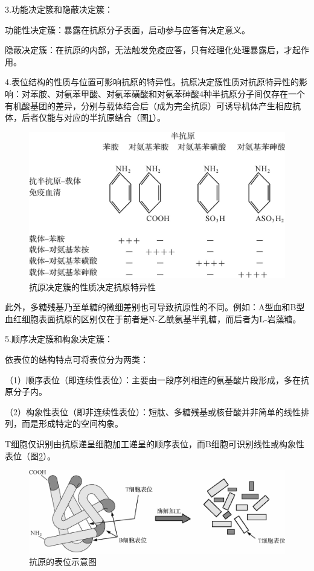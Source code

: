 3.功能决定簇和隐蔽决定簇：

功能性决定簇：暴露在抗原分子表面，启动参与应答有决定意义。

隐蔽决定簇：在抗原的内部，无法触发免疫应答，只有经理化处理暴露后，才起作用。

4.表位结构的性质与位置可影响抗原的特异性。抗原决定簇性质对抗原特异性的影响：对苯胺、对氨苯甲酸、对氨苯磺酸和对氨苯砷酸4种半抗原分子间仅存在一个有机酸基团的差异，分别与载体结合后（成为完全抗原）可诱导机体产生相应抗体，后者仅能与对应的半抗原结合（图\ref{fig3-3}）。

\begin{figure}[!htbp]
 \centering
 \includegraphics[width=.6\textwidth]{./images/Image00052.jpg}
 \captionsetup{justification=centering}
 \caption{抗原决定簇的性质决定抗原特异性}
 \label{fig3-3}
  \end{figure}

此外，多糖残基乃至单糖的微细差别也可导致抗原性的不同。例如：A型血和B型血红细胞表面抗原的区别仅在于前者是N-乙酰氨基半乳糖，而后者为L-岩藻糖。

5.顺序决定簇和构象决定簇：

依表位的结构特点可将表位分为两类：

（1）顺序表位（即连续性表位）：主要由一段序列相连的氨基酸片段形成，多在抗原分子内。

（2）构象性表位（即非连续性表位）：短肽、多糖残基或核苷酸并非简单的线性排列，而是形成特定的空间构象。

T细胞仅识别由抗原递呈细胞加工递呈的顺序表位，而B细胞可识别线性或构象性表位（图\ref{fig3-4}）。

\begin{figure}[!htbp]
 \centering
 \includegraphics{./images/Image00053.jpg}
 \captionsetup{justification=centering}
 \caption{抗原的表位示意图}
 \label{fig3-4}
  \end{figure}

